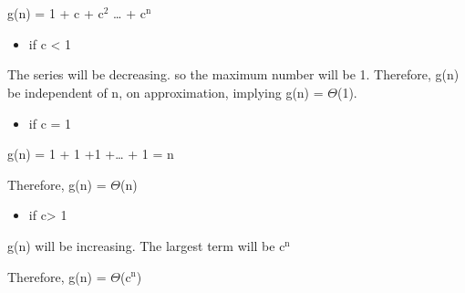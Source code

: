 \documentclass{book}
\begin{document}
\section{}
\label{sec:orgf24fd30}
g(n) = 1 + c + c\(^{\text{2}}\) \ldots{} + c\(^{\text{n}}\)
\begin{itemize}
\item if c < 1
\end{itemize}

The series will be decreasing. so the maximum number will be 1. Therefore, g(n) be independent of n, on approximation, implying g(n) = \(\Theta\)(1).
\begin{itemize}
\item if c = 1
\end{itemize}

g(n) = 1 + 1 +1 +\ldots{} + 1 = n

Therefore, g(n) = \(\Theta\)(n)
\begin{itemize}
\item if c> 1
\end{itemize}

g(n) will be increasing. The largest term will be c\(^{\text{n}}\)

Therefore, g(n) = \(\Theta\)(c\(^{\text{n}}\))
\end{document}
